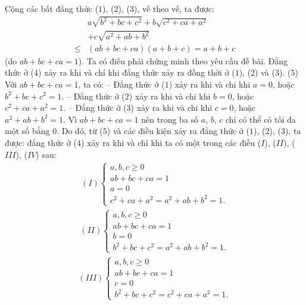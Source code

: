 \begin{multicols}{2}
\begin{align*}
	\end{align*}
	Cộng các bất đẳng thức ($1$), ($2$), ($3$), vế theo vế, ta được:
	\begin{align*}
		&a\sqrt {{b^2} + bc + {c^2}}  + b\sqrt {{c^2} + ca + {a^2}}  \\
		&+ c\sqrt {{a^2} + ab + {b^2}}  \\
		\le &\left( {ab \!+\! bc \!+\! ca} \right)\!\left( {a \!+\! b \!+\! c} \right) \!=\! a \!+\! b \!+\! c \tag{$4$}
	\end{align*}
	(do $ab + bc + ca = 1$).
	\vskip 0.05cm
	Ta có điều phải chứng minh theo yêu cầu đề bài.
	\vskip 0.05cm
	Đẳng thức ở ($4$) xảy ra khi và chỉ khi đẳng thức xảy ra đồng thời ở ($1$), ($2$) và ($3$).                    \hfill ($5$)
	\vskip 0.05cm
	Với a$b + bc + ca = 1$, ta có:
	\vskip 0.05cm
	-- Đẳng thức ở ($1$) xảy ra khi và chi khi $a = 0$, hoặc $b^2 + bc + c^2 = 1$. 
	\vskip 0.05cm 
	-- Đẳng thức ở ($2$) xảy ra khi và chi khi $b = 0$, hoặc  $c^2 + ca + a^2 = 1$.
	\vskip 0.05cm
	-- Đẳng thức ở ($3$) xảy ra khi và chi khi $c = 0$, hoặc  $a^2 + ab + b^2 = 1$.
	\vskip 0.05cm
	Vì $ab + bc + ca = 1$ nên trong ba số $a$, $b$, $c$ chỉ có thể có tối đa một số bằng $0$. Do đó, từ ($5$) và các điều kiện xảy ra đẳng thức ở ($1$), ($2$), ($3$), ta được: đẳng thức ở ($4$) xảy ra khi và chỉ khi ta có một trong các điều ($I$), ($II$), ($III$), ($IV$) sau:
	\begin{align*}
		(I)\begin{cases}
			a,b,c \ge 0\\
			ab + bc + ca = 1\\ 
			a = 0\\
			{c^2} + ca + {a^2} = {a^2} + ab + {b^2} = 1.
		\end{cases}
	\end{align*}
	\begin{align*}
		(II)\begin{cases}
			a,b,c \ge 0\\
			ab + bc + ca = 1\\
			b = 0\\
			{b^2} + bc + {c^2} = {a^2} + ab + {b^2} = 1.
		\end{cases}
	\end{align*}
	\begin{align*}
		(III)\begin{cases}
			a,b,c \ge 0\\
			ab + bc + ca = 1\\
			c = 0\\
			{b^2} + bc + {c^2} = {c^2} + ca + {a^2} = 1.

\end{cases}
\end{align*}
\end{multicols}
